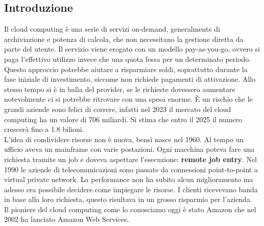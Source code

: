 \documentclass[12pt]{article}
\begin{document}
\subsection{Introduzione}
Il cloud computing è una serie di servizi on-demand, generalmente di archiviazione 
e potenza di calcola, che non necessitano la gestione diretta da parte del utente. 
Il servizio viene erogato con un modello pay-as-you-go, ovvero si paga l'effettivo 
utilizzo invece che una quota fessa per un determinato periodo. 
Questo approccio potrebbe aiutare a risparmiare soldi, soprattutto durante 
la fase iniziale di investimento, siccome non richiede pagamenti di attivazione.
Allo stesso tempo si è in balìa del provider, se le richieste dovessero 
aumentare notevolmente ci si potrebbe ritrovare con una spesa enorme.
È un rischio che le grandi aziende sono felici di correre, infatti nel 2023 il 
mercato del cloud computing ha un valore di 706 miliardi. Si stima che entro il 
2025 il numero crescerà fino a 1.8 bilioni. 
\\ L'idea di condividere risorse non è nuova, bensì nasce nel 1960. Al tempo 
un ufficio aveva un mainframe con varie postazioni. Ogni macchina poteva fare 
una richiesta tramite un job e doveva aspettare l'esecuzione: 
\textbf{remote job entry}.
Nel 1990 le aziende di telecomunicazioni sono passate da connessioni 
point-to-point a virtual private network.
La performance non ha subito alcun miglioramento ma adesso era possibile 
decidere come impiegare le risorse. I clienti ricevevano banda in base 
alla loro richiesta, questo risultava in un grosso risparmio per l'azienda.
\\ Il pioniere del cloud computing come lo conosciamo oggi è stato Amazon che 
nel 2002 ha lanciato Amazon Web Services.
\end{document}
